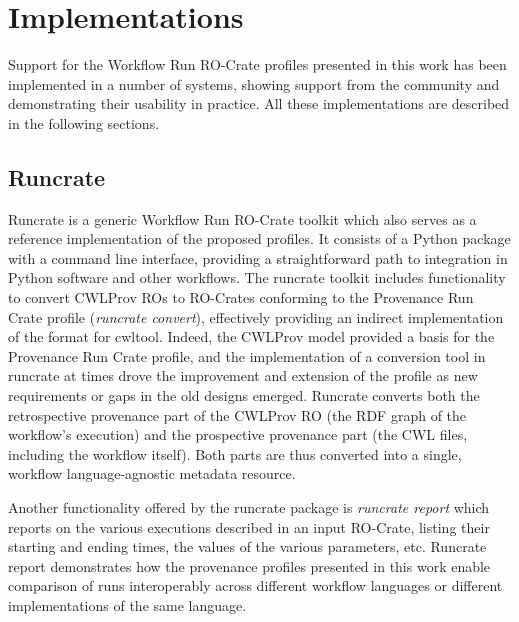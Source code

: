 \documentclass[10pt,letterpaper]{article}
\begin{document}
\section{Implementations}\label{implementations}

Support for the Workflow Run RO-Crate profiles presented in this work has been implemented in a number of systems, showing support from the community and demonstrating their usability in practice.
All these implementations are described in the following sections.


\subsection{Runcrate}\label{runcrate}

Runcrate \cite{runcrate} is a generic Workflow Run RO-Crate toolkit which also serves as a reference implementation of the proposed profiles.
It consists of a Python package with a command line interface, providing a straightforward path to integration in Python software and other workflows.
The runcrate toolkit includes functionality to convert CWLProv ROs to RO-Crates conforming to the Provenance Run Crate profile (\emph{runcrate convert}), effectively providing an indirect implementation of the format for cwltool.
Indeed, the CWLProv model provided a basis for the Provenance Run Crate profile, and the implementation of a conversion tool in runcrate at times drove the improvement and extension of the profile as new requirements or gaps in the old designs emerged.
Runcrate converts both the retrospective provenance part of the CWLProv RO (the RDF graph of the workflow's execution) and the prospective provenance part (the CWL files, including the workflow itself).
Both parts are thus converted into a single, workflow language-agnostic metadata resource.

Another functionality offered by the runcrate package is \emph{runcrate report} which reports on the various executions described in an input RO-Crate, listing their starting and ending times, the values of the various parameters, etc.
Runcrate report demonstrates how the provenance profiles presented in this work enable comparison of runs interoperably across different workflow languages or different implementations of the same language.
\end{document}
